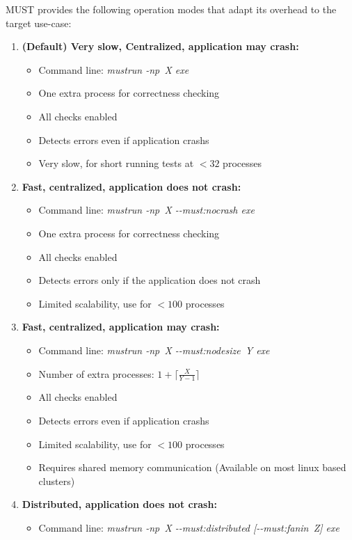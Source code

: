 \documentclass[english]{scrartcl}
\begin{document}
MUST provides the following operation modes that adapt its overhead to the
target use-case:
\begin{enumerate}
  \item \textbf{(Default) Very slow, Centralized, application may crash:}
  \begin{itemize}
    \item Command line: \emph{mustrun \mbox{-np X} exe}
    \item One extra process for correctness checking
    \item All checks enabled
    \item Detects errors even if application crashs
    \item Very slow, for short running tests at $<32$ processes
  \end{itemize}
  \item \textbf{Fast, centralized, application does not crash:}
  \begin{itemize}
    \item Command line: \emph{mustrun \mbox{-np X} \mbox{-{}-must:nocrash} exe}
    \item One extra process for correctness checking
    \item All checks enabled
    \item Detects errors only if the application does not crash %
    \item Limited scalability, use for $<100$ processes 
  \end{itemize}
  \item \textbf{Fast, centralized, application may crash:}
  \begin{itemize}
    \item Command line: \emph{mustrun \mbox{-np X} \mbox{-{}-must:nodesize Y} exe}
    \item Number of extra processes: $1+\lceil{}\frac{X}{Y-1}\rceil{}$
    \item All checks enabled
    \item Detects errors even if application crashs
    \item Limited scalability, use for $<100$ processes
    \item Requires shared memory communication (Available on most linux based
    clusters) 
  \end{itemize}
  \item \textbf{Distributed, application does not crash:}
  \begin{itemize}
    \item Command line: \emph{mustrun \mbox{-np X} \mbox{-{}-must:distributed} [\mbox{-{}-must:fanin Z}] exe}

\end{itemize}
\end{enumerate}
\end{document}
